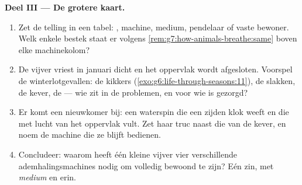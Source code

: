 \begin{problem}
\medskip\noindent\textbf{Deel III --- De grotere kaart.}
\begin{enumerate}[resume]
  \item Zet de telling in een tabel: , machine, medium, pendelaar of
        vaste bewoner. Welk enkele bestek staat er volgens
        \cref{rem:g7:how-animals-breathe:same} boven elke machinekolom?
  \item De vijver vriest in januari dicht en het oppervlak wordt
        afgesloten. Voorspel de winterlotgevallen: de kikkers
        (\cref{exo:g6:life-through-seasons:11}), de slakken, de kever, de
         --- wie zit in de problemen, en voor wie is gezorgd?
  \item Er komt een nieuwkomer bij: een waterspin die een zijden klok
        weeft en die met lucht van het oppervlak vult. Zet haar truc naast
        die van de kever, en noem de machine die ze blijft bedienen.
  \item Concludeer: waarom heeft één kleine vijver vier verschillende
        ademhalingsmachines nodig om volledig bewoond te zijn? Eén zin,
        met \emph{medium} en \emph{} erin.
\end{enumerate}
\end{problem}
